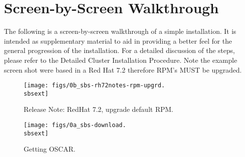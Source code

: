 %
%
%

\newpage

\section{Screen-by-Screen Walkthrough}
\label{app:screen-by-screen}

The following is a screen-by-screen walkthrough of a simple installation.
It is intended as supplementary material to aid in providing a better feel
for the general progression of the installation.  For a detailed discussion
of the steps, please refer to the Detailed Cluster Installation Procedure. 
Note the example screen shot were based in a Red Hat 7.2 therefore
RPM's MUST be upgraded. 

\setlength{\oddsidemargin}{-0.5in}
\setlength{\evensidemargin}{-0.5in}
\setlength{\textwidth}{7.5in}

\begin{figure}[htbp]
  \begin{center}
    \texttt{[image: figs/0b\_sbs-rh72notes-rpm-upgrd.\\sbsext]}
    \caption{Release Note: RedHat 7.2, upgrade default RPM.}
    \label{fig:sbs-rh72notes-rpm-upgrd}
  \end{center}
\end{figure}


\begin{figure}[htbp]
  \begin{center}
    \texttt{[image: figs/0a\_sbs-download.\\sbsext]}
    \caption{Getting OSCAR.}
    \label{fig:sbs-getting-oscar}
  \end{center}
\end{figure}


